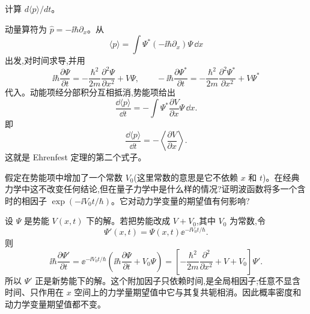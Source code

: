 \begin{question}
计算 $d\langle p\rangle/dt$。
\end{question}
\begin{solution}
动量算符为 $\hat p=-\ii\hbar\partial_x$。从
\[
\langle p\rangle=\int \Psi^*(-\ii\hbar\partial_x)\Psi\,\dd x
\]
出发,对时间求导,并用
\[
\ii\hbar\frac{\partial\Psi}{\partial t}= -\frac{\hbar^2}{2m}\frac{\partial^2\Psi}{\partial x^2}+V\Psi,
\qquad
-\ii\hbar\frac{\partial\Psi^*}{\partial t}= -\frac{\hbar^2}{2m}\frac{\partial^2\Psi^*}{\partial x^2}+V\Psi^*
\]
代入。动能项经分部积分互相抵消,势能项给出
\[
\frac{\dd\langle p\rangle}{\dd t}
=-\int \Psi^*\frac{\partial V}{\partial x}\Psi\,\dd x.
\]
即
\[
\boxed{\displaystyle \frac{\dd\langle p\rangle}{\dd t}= -\left\langle \frac{\partial V}{\partial x}\right\rangle.}
\]
这就是 Ehrenfest 定理的第二个式子。
\end{solution}

\begin{question}
假定在势能项中增加了一个常数 $V_0$(这里常数的意思是它不依赖 $x$ 和 $t$)。在经典力学中这不改变任何结论,但在量子力学中是什么样的情况?证明波函数将多一个含时的相因子 $\exp(-\ii V_0t/\hbar)$。它对动力学变量的期望值有何影响?
\end{question}
\begin{solution}
设 $\Psi$ 是势能 $V(x,t)$ 下的解。若把势能改成 $V+V_0$,其中 $V_0$ 为常数,令
\[
\Psi'(x,t)=\Psi(x,t)\ee^{-\ii V_0t/\hbar}.
\]
则
\[
\ii\hbar\frac{\partial\Psi'}{\partial t}
=\ee^{-\ii V_0t/\hbar}\left(\ii\hbar\frac{\partial\Psi}{\partial t}+V_0\Psi\right)
=\left[-\frac{\hbar^2}{2m}\frac{\partial^2}{\partial x^2}+V+V_0\right]\Psi'.
\]
所以 $\Psi'$ 正是新势能下的解。这个附加因子只依赖时间,是全局相因子;任意不显含时间、只作用在 $x$ 空间上的力学量期望值中它与其复共轭相消。因此概率密度和动力学变量期望值都不变。
\end{solution}

